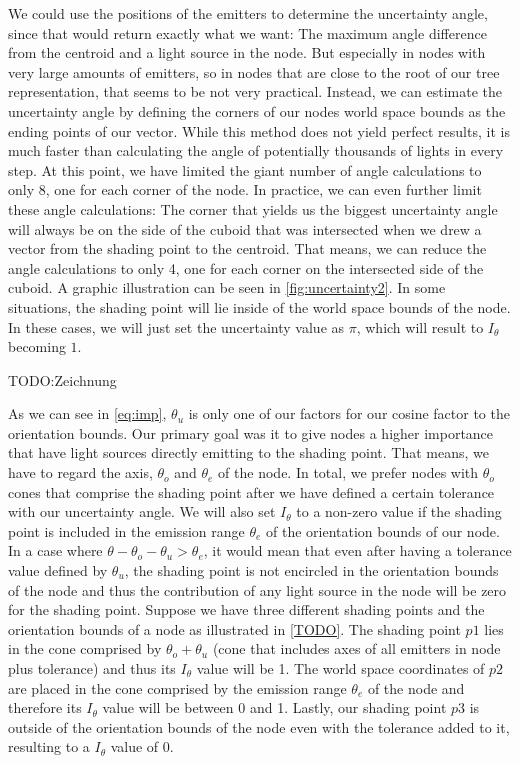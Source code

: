 We could use the positions of the emitters to determine the uncertainty angle, since that would return exactly what we want: The maximum angle difference from the centroid and a light source in the node. But especially in nodes with very large amounts of emitters, so in nodes that are close to the root of our tree representation, that seems to be not very practical. Instead, we can estimate the uncertainty angle by defining the corners of our nodes world space bounds as the ending points of our vector. While this method does not yield perfect results, it is much faster than calculating the angle of potentially thousands of lights in every step. At this point, we have limited the giant number of angle calculations to only 8, one for each corner of the node. In practice, we can even further limit these angle calculations: The corner that yields us the biggest uncertainty angle will always be on the side of the cuboid that was intersected when we drew a vector from the shading point to the centroid. That means, we can reduce the angle calculations to only 4, one for each corner on the intersected side of the cuboid. A graphic illustration can be seen in \ref{fig:uncertainty2}. In some situations, the shading point will lie inside of the world space bounds of the node. In these cases, we will just set the uncertainty value as $\pi$, which will result to $I_\theta$ becoming $1$.

TODO:Zeichnung

As we can see in \ref{eq:imp}, $\theta_u$ is only one of our factors for our cosine factor to the orientation bounds. Our primary goal was it to give nodes a higher importance that have light sources directly emitting to the shading point. That means, we have to regard the axis, $\theta_o$ and $\theta_e$ of the node. In total, we prefer nodes with $\theta_o$ cones that comprise the shading point after we have defined a certain tolerance with our uncertainty angle. We will also set $I_\theta$ to a non-zero value if the shading point is included in the emission range $\theta_e$ of the orientation bounds of our node. In a case where $\theta - \theta_o - \theta_u > \theta_e$, it would mean that even after having a tolerance value defined by $\theta_u$, the shading point is not encircled in the orientation bounds of the node and thus the contribution of any light source in the node will be zero for the shading point. Suppose we have three different shading points and the orientation bounds of a node as illustrated in \ref{TODO}. The shading point $p1$ lies in the cone comprised by $\theta_o + \theta_u$ (cone that includes axes of all emitters in node plus tolerance) and thus its $I_\theta$ value will be 1. The world space coordinates of $p2$ are placed in the cone comprised by the emission range $\theta_e$ of the node and therefore its $I_\theta$ value will be between 0 and 1. Lastly, our shading point $p3$ is outside of the orientation bounds of the node even with the tolerance added to it, resulting to a $I_\theta$ value of 0.

